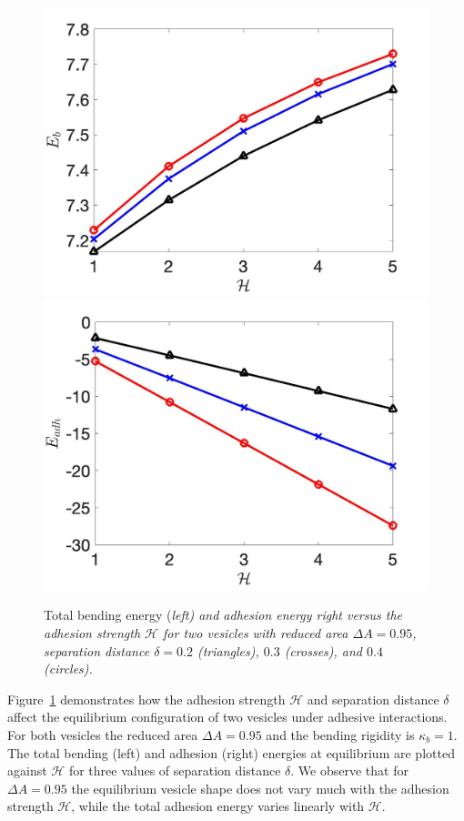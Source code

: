\documentclass[prf,superscriptaddress,showpacs]{revtex4-1}
\begin{document}
\begin{figure}
\includegraphics[keepaspectratio=true,scale=0.18]{figs/Dec18_Eb_vs_sigma_rA0p9502.jpeg}
\includegraphics[keepaspectratio=true,scale=0.18]{figs/Dec18_Eadh_vs_sigma_rA0p9502.jpeg}
  \caption{\label{fig:Dec18_equilibrium} Total bending energy (\em left)
  and adhesion energy {\em right} versus the adhesion strength
  $\mathcal{H}$ for two vesicles with reduced area $\Delta A=0.95$,
  separation distance $\delta = 0.2$ (triangles), $0.3$ (crosses), and
  $0.4$ (circles).}
\end{figure}

Figure~\ref{fig:Dec18_equilibrium} demonstrates how the adhesion
strength $\mathcal{H}$ and separation distance $\delta$ affect the
equilibrium configuration of two vesicles under adhesive interactions.
For both vesicles the reduced area $\Delta A=0.95$ and the bending
rigidity is $\kappa_b = 1$.  The total bending (left) and adhesion
(right) energies at equilibrium are plotted against $\mathcal{H}$ for
three values of separation distance $\delta$.  We observe that for
$\Delta A=0.95$ the equilibrium vesicle shape does not vary much with
the adhesion strength $\mathcal{H}$, while the total adhesion energy
varies linearly with $\mathcal{H}$.
\end{document}
